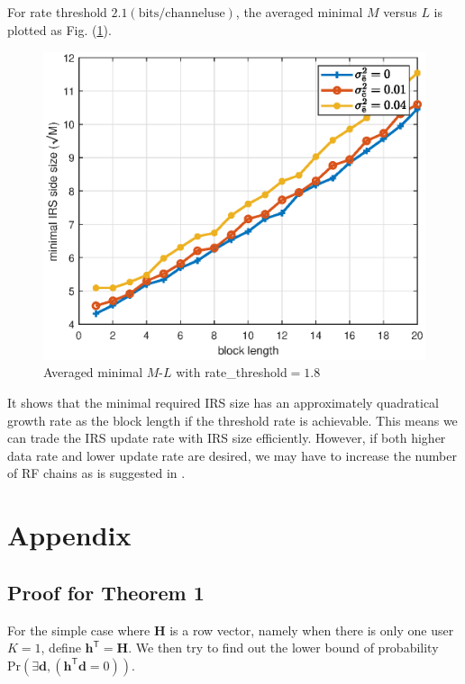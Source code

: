 \documentclass[12pt,draftclsnofoot,onecolumn,journal]{IEEEtran}
\begin{document}
For rate threshold $2.1\mathrm{(bits/channel use)}$, the averaged minimal $M$ versus $L$ is plotted as Fig. (\ref{fig:MLr18}). 
\begin{figure}[htbp]\flushleft
\includegraphics[width=6in]{requiredSurdM.eps} 
\caption{Averaged minimal $M$-$L$ with rate\_threshold$=1.8$} \label{fig:MLr18}
\end{figure}
It shows that the minimal required IRS size has an approximately quadratical growth rate as the block length if the threshold rate is achievable. This means we can trade the IRS update rate with IRS size efficiently. However, if both higher data rate and lower update rate are desired, we may have to increase the number of RF chains as is suggested in \cite{sedaghat2017novel}.


\section{Appendix}
\subsection{Proof for Theorem 1}
For the simple case where $\mathbf H$ is a row vector, namely when there is only one user $K=1$,  define $\mathbf h^{\mathsf{T}}=\mathbf H$. We then try to find out the lower bound of probability $\mathrm{Pr}(\exists \mathbf d,(\mathbf h^{\mathsf{T}} \mathbf d=0))$. 
\end{document}
